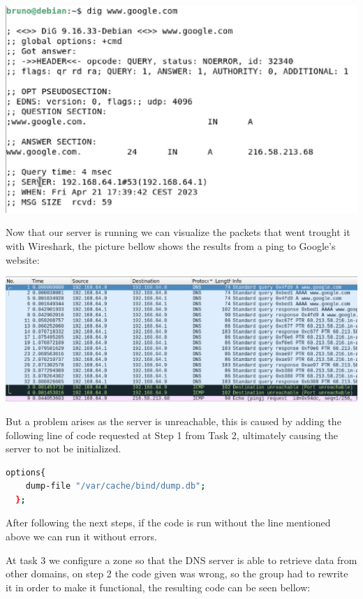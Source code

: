 \documentclass{article}
\begin{document}
\hbox{}

\includegraphics[scale=0.5]{images/dig-google.png}

\hbox{}

Now that our server is running we can visualize the packets that went trought it with Wireshark, the picture bellow shows the results from a ping to Google's website:

\hbox{}

\includegraphics[scale=0.5]{images/ping-google.png}

\hbox{}

But a problem arises as the server is unreachable, this is caused by adding the following line of code requested at Step 1 from Task 2, ultimately causing the server to not be initialized.

\hbox{}

\begin{lstlisting}[language=bash, frame=tlbr, framesep=6pt, backgroundcolor=\color{light-gray}]
  options{
    dump-file "/var/cache/bind/dump.db";
  };
\end{lstlisting}

After following the next steps, if the code is run without the line mentioned above we can run it without errors.

At task 3 we configure a zone so that the DNS server is able to retrieve data from other domains, on step 2 the code given was wrong, so the group had to rewrite it in order to make it functional, the resulting code can be seen bellow:
\end{document}
